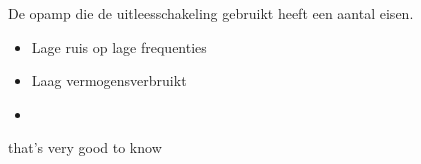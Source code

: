 De opamp die de uitleesschakeling gebruikt heeft een aantal eisen.
\begin{itemize}
    \item Lage ruis op lage frequenties
    \item Laag vermogensverbruikt
    \item 
\end{itemize}that's very good to know